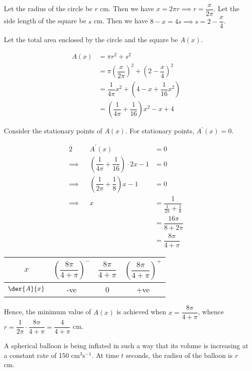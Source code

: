 \documentclass{jhwhw}
\begin{document}
    \solution
        Let the radius of the circle be $r$ cm. Then we have $x = 2\pi r \implies r = \dfrac{x}{2\pi}$. Let the side length of the square be $s$ cm. Then we have $8-x=4s \implies s = 2-\dfrac{x}4$.

        Let the total area enclosed by the circle and the square be $A(x)$.

        \begin{align*}
            A(x) &= \pi r^2 + s^2\\
            &= \pi \left(\dfrac{x}{2\pi}\right)^2 + \left(2-\dfrac{x}4\right)^2\\
            &= \dfrac1{4\pi}x^2 + \left(4 - x + \dfrac1{16}x^2\right)\\
            &= \left(\dfrac1{4\pi} + \dfrac1{16}\right)x^2 - x + 4
        \end{align*}

        Consider the stationary points of $A(x)$. For stationary points, $A^\prime(x) = 0$.

        \begin{alignat*}{2}
            &&A^\prime(x) &= 0\\
            \implies&&\left(\dfrac1{4\pi} + \dfrac1{16}\right)\cdot 2x - 1 &= 0\\
            \implies&&\left(\dfrac1{2\pi} + \dfrac1{8}\right)x - 1 &= 0\\
            \implies&& x &= \dfrac1{\tfrac1{2\pi} + \tfrac1{8}}\\
            && &= \dfrac{16\pi}{8 + 2\pi}\\
            && &=\dfrac{8\pi}{4 + \pi}
        \end{alignat*}

        \begin{table}[h]
            \centering
            \begin{tabular}{|c|c|c|c|}
            \hline
            $x$ & $\left(\dfrac{8\pi}{4 + \pi}\right)^-$ & $\dfrac{8\pi}{4 + \pi}$ & $\left(\dfrac{8\pi}{4 + \pi}\right)^+$ \\\hline
            $\der{A}{x}$ & -ve   & 0 & +ve   \\[1ex]\hline
            \end{tabular}
        \end{table}

        Hence, the minimum value of $A(x)$ is achieved when $x = \dfrac{8\pi}{4 + \pi}$, whence $r = \dfrac{1}{2\pi} \cdot \dfrac{8\pi}{4 + \pi} = \dfrac{4}{4+\pi}$ cm.

    \problem{}
        A spherical balloon is being inflated in such a way that its volume is increasing at a constant rate of 150 cm$^3$s$^{-1}$. At time $t$ seconds, the radisu of the balloon is $r$ cm.
\end{document}
